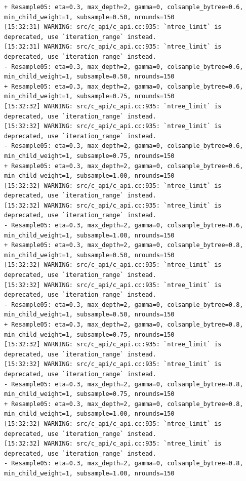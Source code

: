 \documentclass[
  letterpaper,
  DIV=11,
  numbers=noendperiod]{scrartcl}
\begin{document}
\begin{verbatim}
+ Resample05: eta=0.3, max_depth=2, gamma=0, colsample_bytree=0.6, min_child_weight=1, subsample=0.50, nrounds=150 
[15:32:31] WARNING: src/c_api/c_api.cc:935: `ntree_limit` is deprecated, use `iteration_range` instead.
[15:32:31] WARNING: src/c_api/c_api.cc:935: `ntree_limit` is deprecated, use `iteration_range` instead.
- Resample05: eta=0.3, max_depth=2, gamma=0, colsample_bytree=0.6, min_child_weight=1, subsample=0.50, nrounds=150 
+ Resample05: eta=0.3, max_depth=2, gamma=0, colsample_bytree=0.6, min_child_weight=1, subsample=0.75, nrounds=150 
[15:32:32] WARNING: src/c_api/c_api.cc:935: `ntree_limit` is deprecated, use `iteration_range` instead.
[15:32:32] WARNING: src/c_api/c_api.cc:935: `ntree_limit` is deprecated, use `iteration_range` instead.
- Resample05: eta=0.3, max_depth=2, gamma=0, colsample_bytree=0.6, min_child_weight=1, subsample=0.75, nrounds=150 
+ Resample05: eta=0.3, max_depth=2, gamma=0, colsample_bytree=0.6, min_child_weight=1, subsample=1.00, nrounds=150 
[15:32:32] WARNING: src/c_api/c_api.cc:935: `ntree_limit` is deprecated, use `iteration_range` instead.
[15:32:32] WARNING: src/c_api/c_api.cc:935: `ntree_limit` is deprecated, use `iteration_range` instead.
- Resample05: eta=0.3, max_depth=2, gamma=0, colsample_bytree=0.6, min_child_weight=1, subsample=1.00, nrounds=150 
+ Resample05: eta=0.3, max_depth=2, gamma=0, colsample_bytree=0.8, min_child_weight=1, subsample=0.50, nrounds=150 
[15:32:32] WARNING: src/c_api/c_api.cc:935: `ntree_limit` is deprecated, use `iteration_range` instead.
[15:32:32] WARNING: src/c_api/c_api.cc:935: `ntree_limit` is deprecated, use `iteration_range` instead.
- Resample05: eta=0.3, max_depth=2, gamma=0, colsample_bytree=0.8, min_child_weight=1, subsample=0.50, nrounds=150 
+ Resample05: eta=0.3, max_depth=2, gamma=0, colsample_bytree=0.8, min_child_weight=1, subsample=0.75, nrounds=150 
[15:32:32] WARNING: src/c_api/c_api.cc:935: `ntree_limit` is deprecated, use `iteration_range` instead.
[15:32:32] WARNING: src/c_api/c_api.cc:935: `ntree_limit` is deprecated, use `iteration_range` instead.
- Resample05: eta=0.3, max_depth=2, gamma=0, colsample_bytree=0.8, min_child_weight=1, subsample=0.75, nrounds=150 
+ Resample05: eta=0.3, max_depth=2, gamma=0, colsample_bytree=0.8, min_child_weight=1, subsample=1.00, nrounds=150 
[15:32:32] WARNING: src/c_api/c_api.cc:935: `ntree_limit` is deprecated, use `iteration_range` instead.
[15:32:32] WARNING: src/c_api/c_api.cc:935: `ntree_limit` is deprecated, use `iteration_range` instead.
- Resample05: eta=0.3, max_depth=2, gamma=0, colsample_bytree=0.8, min_child_weight=1, subsample=1.00, nrounds=150 

\end{verbatim}
\end{document}
